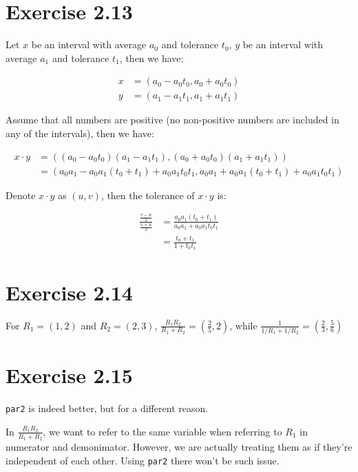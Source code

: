 \documentclass[../main.tex]{subfiles}
\begin{document}
\section{Exercise 2.13}

Let $x$ be an interval with average $a_0$ and tolerance $t_0$,
 $y$ be an interval with average $a_1$ and tolerance $t_1$, then we have:

\begin{align*}
x &= (a_0 - a_0 t_0, a_0 + a_0 t_0) \\
y &= (a_1 - a_1 t_1, a_1 + a_1 t_1)
\end{align*}

Assume that all numbers are positive (no non-positive numbers
 are included in any of the intervals), then we have:

\begin{align*}
x \cdot y &= ((a_0 - a_0 t_0)(a_1 - a_1 t_1), (a_0 + a_0 t_0)(a_1 + a_1 t_1)) \\
&= (a_0 a_1 - a_0 a_1 (t_0 + t_1) + a_0 a_1 t_0 t_1, a_0 a_1 + a_0 a_1 (t_0 + t_1) + a_0 a_1 t_0 t_1)
\end{align*}

Denote $x \cdot y$ as $(u, v)$, then the tolerance of $x \cdot y$ is:

\begin{align*}
\frac{\frac{v-u}{2}}{\frac{v+u}{2}} &= \frac{a_0 a_1 (t_0 + t_1)}{a_0 a_1 + a_0 a_1 t_0 t_1} \\
&= \frac{t_0 + t_1}{1 + t_0 t_1}
\end{align*}

\section{Exercise 2.14}

For $R_1 = (1, 2)$ and $R_2 = (2, 3)$, $\frac{R_1 R_2}{R_1 + R_2} = (\frac{2}{5}, 2)$, while
$\frac{1}{1/R_1 + 1/R_2} = (\frac{2}{3}, \frac{5}{6})$

\section{Exercise 2.15}

\lstinline{par2} is indeed better, but for a different reason.

In $\frac{R_1 R_2}{R_1 + R_2}$, we want to refer to the same variable
 when referring to $R_1$ in numerator and demonimator. However, we are
 actually treating them as if they're independent of each other. Using
 \lstinline{par2} there won't be such issue.
\end{document}

